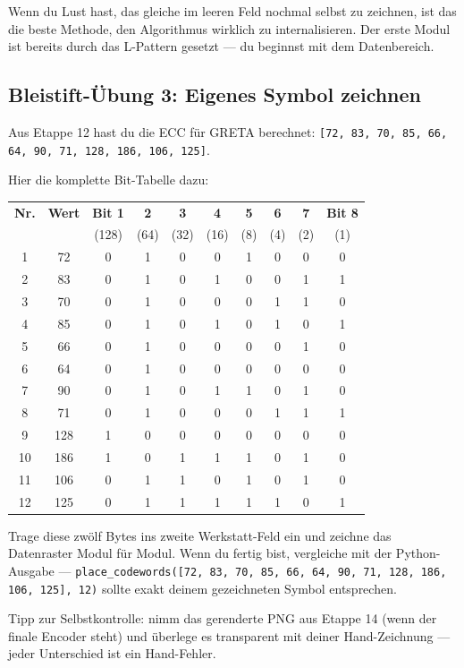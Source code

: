 Wenn du Lust hast, das gleiche im leeren Feld nochmal selbst zu
zeichnen, ist das die beste Methode, den Algorithmus wirklich zu
internalisieren. Der erste Modul ist bereits durch das L-Pattern
gesetzt — du beginnst mit dem Datenbereich.

\subsection*{Bleistift-Übung 3: Eigenes Symbol zeichnen}

Aus Etappe 12 hast du die ECC für GRETA berechnet:
\texttt{[72, 83, 70, 85, 66, 64, 90, 71, 128, 186, 106, 125]}.

Hier die komplette Bit-Tabelle dazu:

\begin{center}
\small
\begin{tabular}{c c | c c c c c c c c}
\toprule
\textbf{Nr.} & \textbf{Wert} & \textbf{Bit 1} & \textbf{2} & \textbf{3} & \textbf{4} & \textbf{5} & \textbf{6} & \textbf{7} & \textbf{Bit 8} \\
                &           & (128) & (64) & (32) & (16) & (8) & (4) & (2) & (1) \\
\midrule
\phantom{0}1  &  72 & 0 & 1 & 0 & 0 & 1 & 0 & 0 & 0 \\
\phantom{0}2  &  83 & 0 & 1 & 0 & 1 & 0 & 0 & 1 & 1 \\
\phantom{0}3  &  70 & 0 & 1 & 0 & 0 & 0 & 1 & 1 & 0 \\
\phantom{0}4  &  85 & 0 & 1 & 0 & 1 & 0 & 1 & 0 & 1 \\
\phantom{0}5  &  66 & 0 & 1 & 0 & 0 & 0 & 0 & 1 & 0 \\
\phantom{0}6  &  64 & 0 & 1 & 0 & 0 & 0 & 0 & 0 & 0 \\
\phantom{0}7  &  90 & 0 & 1 & 0 & 1 & 1 & 0 & 1 & 0 \\
\phantom{0}8  &  71 & 0 & 1 & 0 & 0 & 0 & 1 & 1 & 1 \\
\phantom{0}9  & 128 & 1 & 0 & 0 & 0 & 0 & 0 & 0 & 0 \\
10            & 186 & 1 & 0 & 1 & 1 & 1 & 0 & 1 & 0 \\
11            & 106 & 0 & 1 & 1 & 0 & 1 & 0 & 1 & 0 \\
12            & 125 & 0 & 1 & 1 & 1 & 1 & 1 & 0 & 1 \\
\bottomrule
\end{tabular}
\end{center}

Trage diese zwölf Bytes ins zweite Werkstatt-Feld ein und zeichne
das Datenraster Modul für Modul. Wenn du fertig bist, vergleiche
mit der Python-Ausgabe — \texttt{place\_codewords([72, 83, 70, 85,
66, 64, 90, 71, 128, 186, 106, 125], 12)} sollte exakt deinem
gezeichneten Symbol entsprechen.

Tipp zur Selbstkontrolle: nimm das gerenderte PNG aus Etappe 14
(wenn der finale Encoder steht) und überlege es transparent mit
deiner Hand-Zeichnung — jeder Unterschied ist ein Hand-Fehler.
